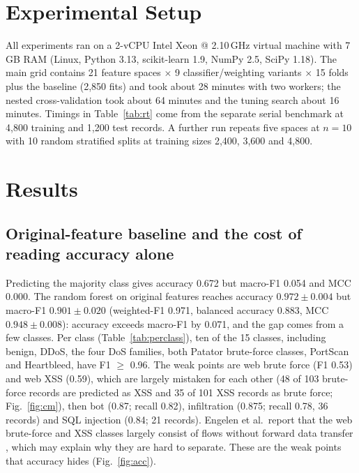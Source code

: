 \documentclass[conference]{IEEEtran}
\newcommand{\tabsize}{\footnotesize}
\begin{document}
\section{Experimental Setup}
All experiments ran on a 2-vCPU Intel Xeon @ 2.10\,GHz virtual machine with 7\,GB RAM (Linux, Python 3.13, scikit-learn 1.9, NumPy 2.5, SciPy 1.18). The main grid contains 21 feature spaces $\times$ 9 classifier/weighting variants $\times$ 15 folds plus the baseline (2{,}850 fits) and took about 28 minutes with two workers; the nested cross-validation took about 64 minutes and the tuning search about 16 minutes. Timings in Table~\ref{tab:rt} come from the separate serial benchmark at 4{,}800 training and 1{,}200 test records. A further run repeats five spaces at $n=10$ with 10 random stratified splits at training sizes 2{,}400, 3{,}600 and 4{,}800.

\section{Results}
\subsection{Original-feature baseline and the cost of reading accuracy alone}
Predicting the majority class gives accuracy 0.672 but macro-F1 0.054 and MCC 0.000. The random forest on original features reaches accuracy $0.972\pm0.004$ but macro-F1 $0.901\pm0.020$ (weighted-F1 0.971, balanced accuracy 0.883, MCC $0.948\pm0.008$): accuracy exceeds macro-F1 by 0.071, and the gap comes from a few classes. Per class (Table~\ref{tab:perclass}), ten of the 15 classes, including benign, DDoS, the four DoS families, both Patator brute-force classes, PortScan and Heartbleed, have F1 $\ge$ 0.96. The weak points are web brute force (F1 0.53) and web XSS (0.59), which are largely mistaken for each other (48 of 103 brute-force records are predicted as XSS and 35 of 101 XSS records as brute force; Fig.~\ref{fig:cm}), then bot (0.87; recall 0.82), infiltration (0.875; recall 0.78, 36 records) and SQL injection (0.84; 21 records). Engelen et al.\ report that the web brute-force and XSS classes largely consist of flows without forward data transfer \cite{engelen2021}, which may explain why they are hard to separate. These are the weak points that accuracy hides (Fig.~\ref{fig:acc}).

\begin{table}[t]
\caption{Per-class results of the selected model (RF, original features), pooled out-of-fold predictions, repeat 1.}\label{tab:perclass}
\centering\tabsize

\end{table}
\end{document}

